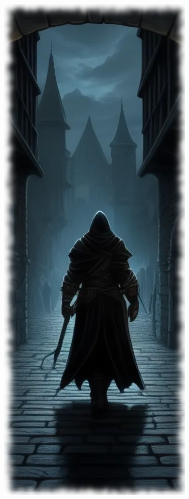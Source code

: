 \begin{figure}
\begin{center}
\includegraphics[scale=0.65]{img/ai-images/thief.png}
\end{center}
\end{figure}
